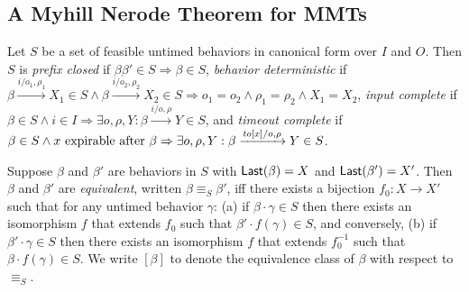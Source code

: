 \subsection{A Myhill Nerode Theorem for MMTs}

\begin{definition}
\label{def:nerode}
Let $S$ be a set of feasible untimed behaviors in canonical form over $I$ and $O$. Then $S$ is
\emph{prefix closed} if $\beta \beta' \in S \Rightarrow \beta \in S$,
\emph{behavior deterministic} if
$\beta \xrightarrow{i/o_1, \rho_1} X_1 \in S \wedge \beta \xrightarrow{i/o_2, \rho_2} X_2 \in S \Rightarrow o_1 = o_2 \wedge \rho_1 = \rho_2 \wedge X_1 = X_2$,
\emph{input complete} if
$\beta \in S \wedge i \in I \Rightarrow \exists o, \rho, Y : \beta \xrightarrow{i/o, \rho} Y \in S$,
and
\emph{timeout complete} if
$\beta \in S \wedge x \mbox{ expirable after } \beta \Rightarrow
\exists o, \rho, Y: \beta \xrightarrow{\mathit{to}[x]/o, \rho} Y \in S$.

Suppose $\beta$ and $\beta'$ are behaviors in $S$ with $\mathsf{Last}({\beta}) = X$ and $\mathsf{Last}({\beta'}) = X'$.
Then $\beta$ and $\beta'$ are \emph{equivalent}, written $\beta \equiv_S \beta'$, iff there exists a bijection
$f_0 : X \to X'$ such that for any untimed behavior $\gamma$:
(a) if $\beta \cdot \gamma \in S$ then there exists an isomorphism $f$ that extends $f_0$ such that $\beta' \cdot f(\gamma) \in S$, and conversely,
(b) if $\beta' \cdot \gamma \in S$ then there exists an isomorphism $f$ that extends $f_0^{-1}$ such that $\beta \cdot f(\gamma) \in S$.
We write $[\beta]$ to denote the equivalence class of $\beta$ with respect to $\equiv_S$.
\end{definition}

